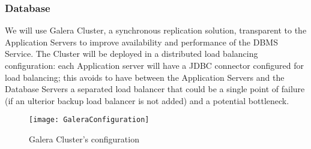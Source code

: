 \subsubsection{Database}
We will use Galera Cluster, a synchronous replication solution, transparent to the Application Servers to improve availability and performance of the DBMS Service. The Cluster will be deployed in a distributed load balancing configuration: each Application server will have a JDBC connector configured for load balancing; this avoids to have between the Application Servers and the Database Servers a separated load balancer that could be a single point of failure (if an ulterior backup load balancer is not added) and a potential bottleneck.
\begin{figure}[H]
 \centering
 \texttt{[image: GaleraConfiguration]}
 \caption{ Galera Cluster's configuration }
 \end{figure}


\newpage
